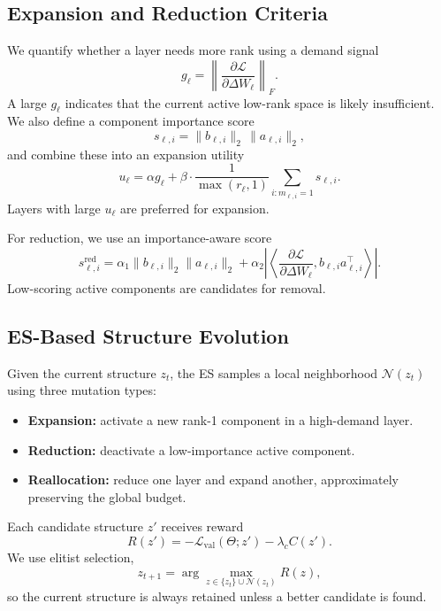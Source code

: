 \documentclass{article}
\begin{document}
\subsection{Expansion and Reduction Criteria}
We quantify whether a layer needs more rank using a demand signal
\begin{equation}
    g_\ell = \left\|\frac{\partial \mathcal{L}}{\partial \Delta W_\ell}\right\|_F.
\end{equation}
A large $g_\ell$ indicates that the current active low-rank space is likely insufficient. We also define a component importance score
\begin{equation}
    s_{\ell,i} = \|b_{\ell,i}\|_2\,\|a_{\ell,i}\|_2,
\end{equation}
and combine these into an expansion utility
\begin{equation}
    u_\ell = \alpha g_\ell + \beta \cdot \frac{1}{\max(r_\ell,1)}\sum_{i:m_{\ell,i}=1} s_{\ell,i}.
\end{equation}
Layers with large $u_\ell$ are preferred for expansion.

For reduction, we use an importance-aware score
\begin{equation}
    s^{\mathrm{red}}_{\ell,i} = \alpha_1\|b_{\ell,i}\|_2\|a_{\ell,i}\|_2 + \alpha_2\left|\left\langle \frac{\partial \mathcal{L}}{\partial \Delta W_\ell}, b_{\ell,i}a_{\ell,i}^{\top}\right\rangle\right|.
\end{equation}
Low-scoring active components are candidates for removal.

\subsection{ES-Based Structure Evolution}
Given the current structure $z_t$, the ES samples a local neighborhood $\mathcal{N}(z_t)$ using three mutation types:
\begin{itemize}[leftmargin=1.2em]
    \item \textbf{Expansion:} activate a new rank-1 component in a high-demand layer.
    \item \textbf{Reduction:} deactivate a low-importance active component.
    \item \textbf{Reallocation:} reduce one layer and expand another, approximately preserving the global budget.
\end{itemize}
Each candidate structure $z'$ receives reward
\begin{equation}
    R(z') = -\mathcal{L}_{\mathrm{val}}(\Theta; z') - \lambda_c C(z').
\end{equation}
We use elitist selection,
\begin{equation}
    z_{t+1} = \arg\max_{z \in \{z_t\} \cup \mathcal{N}(z_t)} R(z),
\end{equation}
so the current structure is always retained unless a better candidate is found.
\end{document}
